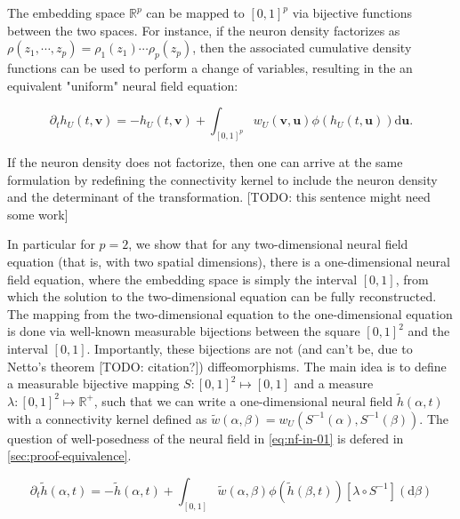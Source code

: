 \documentclass[NETN,manuscript]{stjour-new}
\def\R{\mathbb R}
\def\Rp{\R^p}
\def\d{\mathrm d}
\renewcommand{\vec}[1]{\boldsymbol{#1}}
\begin{document}
The embedding space $\Rp$ can be mapped to $[0,1]^p$ via bijective functions between the two spaces. For instance, if the neuron density factorizes as $\rho(z_1, \cdots, z_p)= \rho_1(z_1) \cdots \rho_p(z_p)$, then the associated cumulative density functions can be used to perform a change of variables, resulting in the an equivalent "uniform" neural field equation:

\begin{equation} \label{eq:nf-in-01p}
\partial_t h_U(t, \vec v) = -h_U(t, \vec v) + \int_{[0,1]^p} w_U(\vec v, \vec u) \phi(h_U(t, \vec u)) \mathrm d \vec u.
\end{equation}

If the neuron density does not factorize, then one can arrive at the same formulation by redefining the connectivity kernel to include the neuron density and the determinant of the transformation. [TODO: this sentence might need some work]

In particular for $p=2$, we show that for any two-dimensional neural field equation (that is, with two spatial dimensions), there is a one-dimensional neural field equation, where the embedding space is simply the interval $[0,1]$, from which the solution to the two-dimensional equation can be fully reconstructed. The mapping from the two-dimensional equation to the one-dimensional equation is done via well-known measurable bijections between the square $[0,1]^2$ and the interval $[0,1]$. Importantly, these bijections are not (and can't be, due to Netto's theorem [TODO: citation?]) diffeomorphisms.
The main idea is to define a measurable bijective mapping $S : [0,1]^2 \mapsto [0,1]$ and a measure $\lambda : [0,1]^2 \mapsto \mathbb{R}^+$, such that we can write a one-dimensional neural field	$\tilde h(\alpha, t)$ with a connectivity kernel defined as $\tilde w(\alpha, \beta) = w_U(S^{-1}(\alpha), S^{-1}(\beta))$. 
The question of well-posedness of the neural field in \autoref{eq:nf-in-01} is defered in \autoref{sec:proof-equivalence}.

\begin{equation} \label{eq:nf-in-01}
\partial_t \tilde h(\alpha, t) = -\tilde h(\alpha, t) + \int_{[0,1]} \tilde w(\alpha, \beta) \phi(\tilde h(\beta, t)) \left[\lambda \circ S^{-1}\right](\d \beta)
\end{equation}
\end{document}
